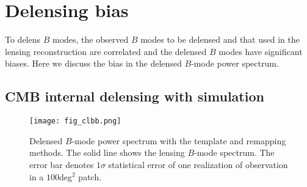 \documentclass[aps,prd,twocolumn,superscriptaddress,groupedaddress,nofootinbib]{revtex4}
\begin{document}
\section{Delensing bias}

To delens $B$ modes, the observed $B$ modes to be delensed and that used in the lensing reconstruction 
are correlated and the delensed $B$ modes have significant biases. 
Here we discuss the bias in the delensed $B$-mode power spectrum. 

\subsection{CMB internal delensing with simulation}

\begin{figure}[t]
\bc
\texttt{[image: fig\_clbb.png]} 
\caption{
Delensed $B$-mode power spectrum with the template and remapping methods. 
The solid line shows the lensing $B$-mode spectrum. 
The error bar denotes $1\sigma$ statistical error of one realization of observation in a $100$deg$^2$ patch. 
}
\label{fig:method}
\ec
\end{figure}
\end{document}
